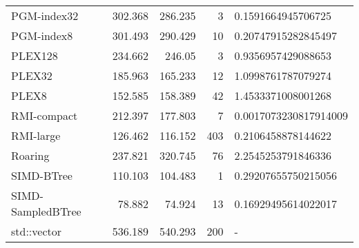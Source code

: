 \begin{tabular}{lrrrl}
 PGM-index32       &                302.368 &               286.235 &            3 & 0.1591664945706725    \\
 PGM-index8        &                301.493 &               290.429 &           10 & 0.20747915282845497   \\
 PLEX128           &                234.662 &               246.05  &            3 & 0.9356957429088653    \\
 PLEX32            &                185.963 &               165.233 &           12 & 1.0998761787079274    \\
 PLEX8             &                152.585 &               158.389 &           42 & 1.4533371008001268    \\
 RMI-compact       &                212.397 &               177.803 &            7 & 0.0017073230817914009 \\
 RMI-large         &                126.462 &               116.152 &          403 & 0.2106458878144622    \\
 Roaring           &                237.821 &               320.745 &           76 & 2.2545253791846336    \\
 SIMD-BTree        &                110.103 &               104.483 &            1 & 0.29207655750215056   \\
 SIMD-SampledBTree &                 78.882 &                74.924 &           13 & 0.16929495614022017   \\
 std::vector       &                536.189 &               540.293 &          200 & -                     \\
\hline
\end{tabular}